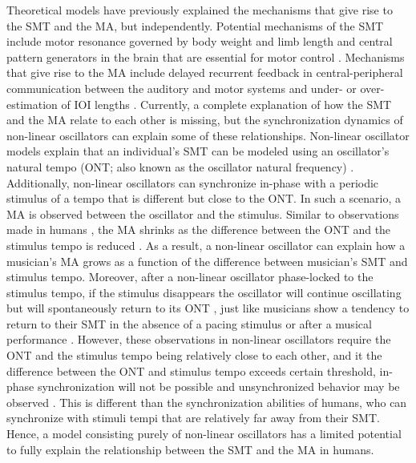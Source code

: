 \documentclass{report}
\begin{document}
Theoretical models have previously explained the mechanisms that give rise to the SMT and the MA, but independently. Potential mechanisms of the SMT include motor resonance governed by body weight and limb length \cite{goodman2000advantages} and central pattern generators in the brain that are essential for motor control \cite{latash1992virtual, wolpert2007probabilistic}. Mechanisms that give rise to the MA include delayed recurrent feedback in central-peripheral communication between the auditory and motor systems \cite{stepp2010strong, roman2019delayed, aschersleben2002temporal} and under- or over-estimation of IOI lengths \cite{loehr2009subdividing}. Currently, a complete explanation of how the SMT and the MA relate to each other is missing, but the synchronization dynamics of non-linear oscillators can explain some of these relationships. Non-linear oscillator models explain that an individual's SMT can be modeled using an oscillator's natural tempo (ONT; also known as the oscillator natural frequency) \cite{large2002tracking, large2002perceiving, mcauley2006time}. Additionally, non-linear oscillators can synchronize in-phase with a periodic stimulus of a tempo that is different but close to the ONT. In such a scenario, a MA is observed between the oscillator and the stimulus. Similar to observations made in humans \cite{scheurich2018tapping}, the MA shrinks as the difference between the ONT and the stimulus tempo is reduced \cite{kim2015signal, kim2019mode}. As a result, a non-linear oscillator can explain how a musician's MA grows as a function of the difference between musician's SMT and stimulus tempo. Moreover, after a non-linear oscillator phase-locked to the stimulus tempo, if the stimulus disappears the oscillator will continue oscillating but will spontaneously return to its ONT \cite{kim2015signal, kim2019mode}, just like musicians show a tendency to return to their SMT in the absence of a pacing stimulus \cite{zamm2018musicians} or after a musical performance \cite{zamm2016endogenous}. However, these observations in non-linear oscillators require the ONT and the stimulus tempo being relatively close to each other, and it the difference between the ONT and stimulus tempo exceeds certain threshold, in-phase synchronization will not be possible and unsynchronized behavior may be observed \cite{kim2015signal, kim2019mode}. This is different than the synchronization abilities of humans, who can synchronize with stimuli tempi that are relatively far away from their SMT. Hence, a model consisting purely of non-linear oscillators has a limited potential to fully explain the relationship between the SMT and the MA in humans.
\end{document}
